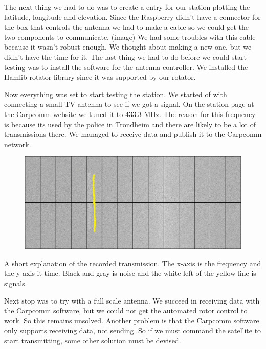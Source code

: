 The next thing we had to do was to create a entry for our station plotting the latitude, longitude and elevation.    
Since the Raspberry didn’t have a connector for the box that controls the antenna we had to make a cable so we could get the two components to communicate. (image) 
We had some troubles with this cable because it wasn't robust enough. We thought about making a new one, but we didn't have the time for it. 
The last thing we had to do before we could start testing was to install the software for the antenna controller. We installed the Hamlib rotator library since it was supported by our rotator. 

Now everything was set to start testing the station. We started of with connecting a small TV-antenna to see if we got a signal. On the station page at the Carpcomm website we tuned it to 433.3 MHz. The reason for this  frequency is because its used by the police in Trondheim and there are likely to be a lot of transmissions there.  We managed to receive data and publish it to the Carpcomm network.

\begin{figure}
	\centering
	\includegraphics[width=\textwidth]{Figures/sattelite_transmition}
	\label{fig: Transmission}
\end{figure}
A short explanation of the recorded transmission. The x-axis is the frequency and the y-axis it time. Black and gray is noise and the white left of the yellow line is signals.

Next stop was to try with a full scale antenna. We succeed in receiving data with the Carpcomm software, but we could not get the automated rotor control to work. So this remains unsolved. Another problem is that the Carpcomm software only supports receiving data, not sending. So if we must command the satellite to start transmitting, some other solution must be devised. 



